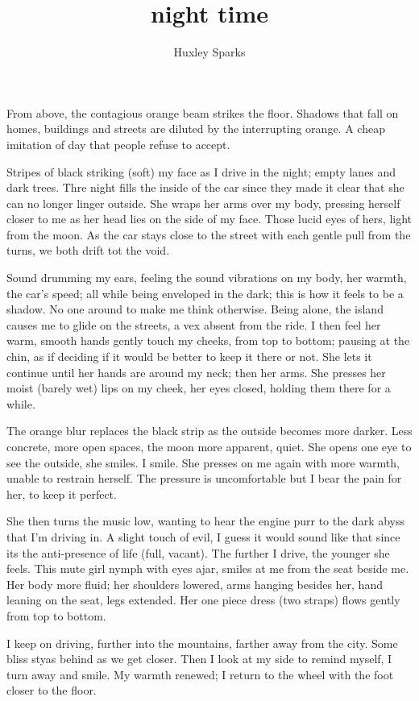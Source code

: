 \title{night time}
\author{Huxley Sparks}

		From above, the contagious orange beam strikes the floor. Shadows that fall on homes, buildings and streets are diluted by the interrupting orange. A 
	cheap imitation of day that people refuse to accept.
		
		Stripes of black striking (soft) my face as I drive in the night; empty lanes and dark trees. Thre night fills the inside of the car since they made
	it clear that she can no longer linger outside. She wraps her arms over my body, pressing herself closer to me as her head lies on the side of my face. Those
	lucid eyes of hers, light from the moon. As the car stays close to the street with each gentle pull from the turns, we both drift tot the void.

		Sound drumming my ears, feeling the sound vibrations on my body, her warmth, the car's speed; all while being enveloped in the dark; this is how it
	feels to be a shadow. No one around to make me think otherwise. Being alone, the island causes me to glide on the streets, a vex absent from the ride. I then
	feel her warm, smooth hands gently touch my cheeks, from top to bottom; pausing at the chin, as if deciding if it would be better to keep it there or not. She
	lets it continue until her hands are around my neck; then her arms. She presses her moist (barely wet) lips on my cheek, her eyes closed, holding them there
	for a while.
		
		The orange blur replaces the black strip as the outside becomes more darker. Less concrete, more open spaces, the moon more apparent, quiet. She opens
	one eye to see the outside, she smiles. I smile. She presses on me again with more warmth, unable to restrain herself. The pressure is uncomfortable but I bear
	the pain for her, to keep it perfect.

		She then turns the music low, wanting to hear the engine purr to the dark abyss that I'm driving in. A slight touch of evil, I guess it would sound 
	like that since its the anti-presence of life (full, vacant). The further I drive, the younger she feels. This mute girl nymph with eyes ajar, smiles at me 
	from the seat beside me. Her body more fluid; her shoulders lowered, arms hanging besides her, hand leaning on the seat, legs extended. Her one piece dress
	(two straps) flows gently from top to bottom.

		I keep on driving, further into the mountains, farther away from the city. Some bliss styas behind as we get closer. Then I look at my side to remind
	myself, I turn away and smile. My warmth renewed; I return to the wheel with the foot closer to the floor.


